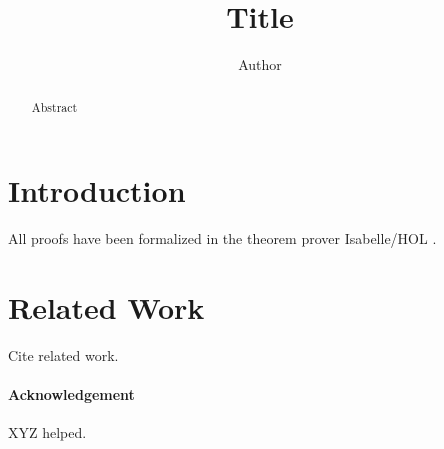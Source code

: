 \documentclass{llncs}
\begin{document}
\title{Title}
\author{Author}
\date{}
\maketitle

\begin{abstract}
Abstract
\end{abstract}


\section{Introduction}

All proofs have been formalized in the theorem prover Isabelle/HOL \cite{LNCS2283,Concrete}.



\section{Related Work}

Cite related work.

\paragraph{Acknowledgement}
XYZ helped.



\end{document}
